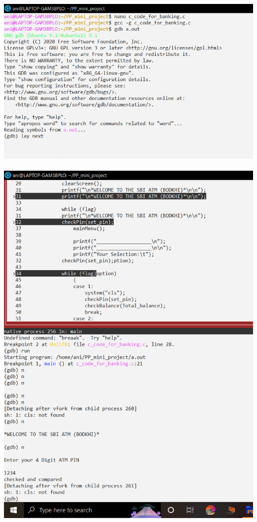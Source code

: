\documentclass{article}
\begin{document}
\includegraphics[scale=0.35]{debugging1.png}   \\ \\
\includegraphics[scale=0.35]{debugging2.png}   \\ \\
\end{document}
